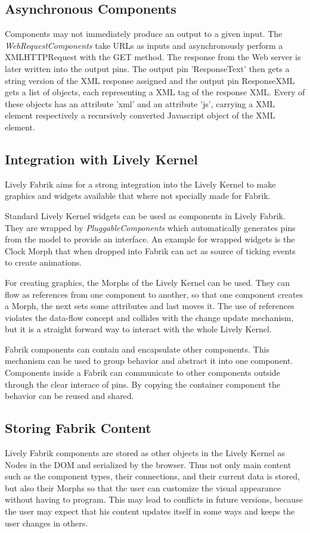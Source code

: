 \documentclass[pdftex, times, 10pt, twocolumn]{article}
\begin{document}
\subsection{Asynchronous Components}
Components may not immediately produce an output to a given input. The {\em WebRequestComponents} take URLs as inputs and asynchronously perform a XMLHTTPRequest with the GET method. The response from the Web server is later written into the output pins. The output pin 'ResponseText' then gets a string version of the XML response assigned and the output pin ResponseXML gets a list of objects, each representing a XML tag of the response XML. Every of these objects has an attribute 'xml' and an attribute 'js', carrying a XML element respectively a recursively converted Javascript object of the XML element. 



\subsection{Integration with Lively Kernel}
Lively Fabrik aims for a strong integration into the Lively Kernel to make graphics and widgets available that where not specially made for Fabrik.  

Standard Lively Kernel widgets can be used as components in Lively Fabrik. They are wrapped by {\em PluggableComponents} which automatically generates pins from the model to provide an interface. An example for wrapped widgets is the Clock Morph that when dropped into Fabrik can act as source of ticking events to create animations. 

For creating graphics, the Morphs of the Lively Kernel can be used. They can flow as references from one component to another, so that one component creates a Morph, the next sets some attributes and last moves it. The use of references violates the data-flow concept and collides with the change update mechanism, but it is a straight forward way to interact with the whole Lively Kernel. 

Fabrik components can contain and encapsulate other components. This mechanism can be used to group behavior and abstract it into one component. Components inside a Fabrik can communicate to other components outside through the clear interace of pins. By copying the container component the behavior can be reused and shared. 



\subsection{Storing Fabrik Content}
Lively Fabrik components are stored as other objects in the Lively Kernel as Nodes in the DOM and serialized by the browser. Thus not only main content such as the component types, their connections, and their current data is stored, but also their Morphs so that the user can customize the visual appearance without having to program. This may lead to conflicts in future versions, because the user may expect that his content updates itself in some ways and keeps the user changes in others.  
\end{document}
